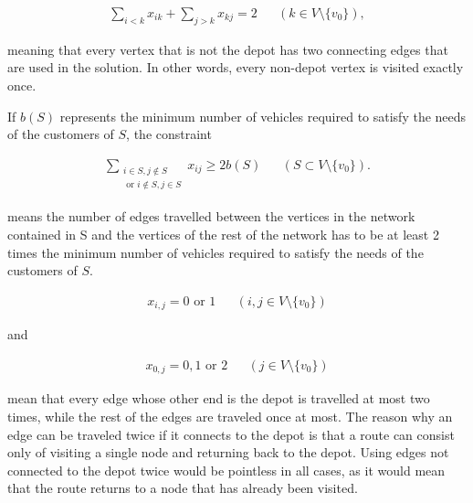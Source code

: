 \begin{equation}
\begin{aligned}
\label{eq:baseformula3}
\displaystyle\sum_{i < k} x_{ik} + \displaystyle\sum_{j > k} x_{kj} = 2 && (k \in V \setminus\{v_0\}),
\end{aligned}
\end{equation}

\noindent
meaning that every vertex that is not the depot has two connecting edges that are used in the solution. In other words, every non-depot vertex is visited exactly once. \cite{laporte2007you}

\medskip
\noindent
If $b(S)$ represents the minimum number of vehicles required to satisfy the needs of the customers of $S$, the constraint

\begin{equation}
\begin{aligned}
\label{eq:baseformula4}
\displaystyle\sum_{\substack{i \in S, j \notin S \\ 
\text{ or } i \notin S, j \in S}} x_{ij} \geq 2b(S) && (S \subset V \setminus\{v_0\}).
\end{aligned}
\end{equation}

\noindent
means the number of edges travelled between the vertices in the network contained in S and the vertices of the rest of the network has to be at least 2 times the minimum number of vehicles required to satisfy the needs of the customers of $S$. \cite{laporte2007you}



\begin{equation}
\begin{aligned}
\label{eq:baseformula5}
x_{i,j} = 0 \text{ or } 1 && (i, j \in V\setminus\{v_0\})
\end{aligned}
\end{equation}

\noindent
and

\begin{equation}
\begin{aligned}
\label{eq:baseformula6}
x_{0,j} = 0, 1 \text{ or } 2 && (j \in V\setminus\{v_0\})
\end{aligned}
\end{equation}

\noindent
mean that every edge whose other end is the depot is travelled at most two times, while the rest of the edges are traveled once at most. The reason why an edge can be traveled twice if it connects to the depot is that a route can consist only of visiting a single node and returning back to the depot. Using edges not connected to the depot twice would be pointless in all cases, as it would mean that the route returns to a node that has already been visited. \cite{laporte2007you}





